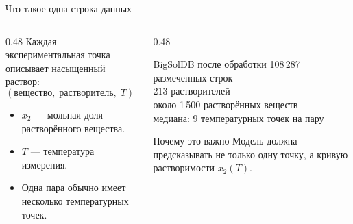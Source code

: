 \documentclass[aspectratio=169,10pt]{beamer}
\newcommand{\tightitems}{\setlength{\itemsep}{0.25em}}
\begin{document}
\begin{frame}{Что такое одна строка данных}
  \small
  \begin{columns}[T,onlytextwidth]
    \begin{column}{0.48\textwidth}
      Каждая экспериментальная точка описывает насыщенный раствор:
      \[
        (\text{вещество},\;\text{растворитель},\;T)\;\longrightarrow\;\ln x_2.
      \]
      \begin{itemize}\tightitems
        \item $x_2$ — мольная доля растворённого вещества.
        \item $T$ — температура измерения.
        \item Одна пара обычно имеет несколько температурных точек.
      \end{itemize}
    \end{column}
    \begin{column}{0.48\textwidth}
      \begin{block}{BigSolDB после обработки}
        \scriptsize
        108\,287 размеченных строк\\
        213 растворителей\\
        около 1\,500 растворённых веществ\\
        медиана: 9 температурных точек на пару
      \end{block}
      \begin{block}{Почему это важно}
        \scriptsize
        Модель должна предсказывать не только одну точку, а кривую растворимости $x_2(T)$.
      \end{block}
    \end{column}
  \end{columns}
\end{frame}
\end{document}

